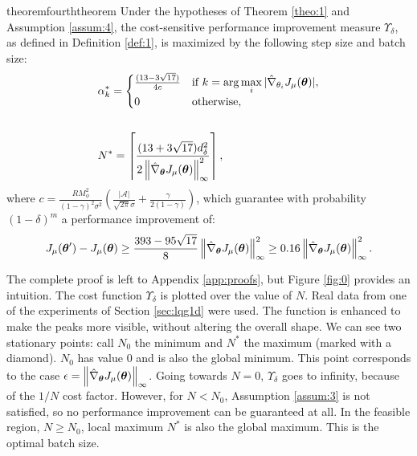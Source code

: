 \begin{restatable}{theorem}{fourththeorem}\label{theo:5}
Under the hypotheses of Theorem \ref{theo:1} and Assumption \ref{assum:4}, the cost-sensitive performance improvement measure $\Upsilon_\delta$, as defined in Definition \ref{def:1}, is maximized by the following step size and batch size: 
\begin{align*}
&\alpha_k^* = 
\begin{cases}  
	\frac{(13-3\sqrt{17})}
		{4c} & 
		\text{if } k = \arg\max\limits_i |\gradApp{\theta_i}|,	\\
		0 & \text{otherwise},
\end{cases}
\\\\
&N^* = \left\lceil\frac{(13+3\sqrt{17})d_{\delta}^2}{2\norm[\infty]{\gradApp{\vtheta}}^2}\right\rceil,
\end{align*}
where $c = \frac{RM_{\phi}^2}{(1-\gamma)^2\sigma^2}\left(\frac{|\mathcal{A}|}{\sqrt{2\pi}\sigma} +	\frac{\gamma}{2(1-\gamma)}\right)$, which guarantee with probability $(1-\delta)^m$ a performance improvement of:
\[
\DeltaJ \geq
\frac{393-95\sqrt{17}}{8}\norm[\infty]{\gradApp{\vtheta}}^2 \geq 0.16 \norm[\infty]{\gradApp{\vtheta}}^2.
\]
\end{restatable}

The complete proof is left to Appendix \ref{app:proofs}, but Figure \ref{fig:0} provides an intuition. The cost function $\Upsilon_\delta$ is plotted over the value of $N$. Real data from one of the experiments of Section \ref{sec:lqg1d} were used. The function is enhanced to make the peaks more visible, without altering the overall shape. We can see two stationary points: call $N_0$ the minimum and $N^*$ the maximum (marked with a diamond). $N_0$ has value $0$ and is also the global minimum. This point corresponds to the case $\epsilon = \norm[\infty]{\gradApp{\vtheta}}$. Going towards $N=0$, $\Upsilon_\delta$ goes to infinity, because of the $1/N$ cost factor. However, for $N<N_0$, Assumption \ref{assum:3} is not satisfied, so no performance improvement can be guaranteed at all. In the feasible region, $N\geq N_0$, local maximum $N^*$ is also the global maximum. This is the optimal batch size.

